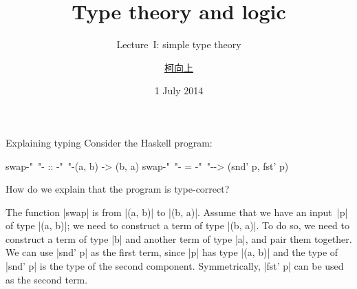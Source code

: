 \documentclass[t,compress,hyperref={hidelinks}]{beamer}
\newcommand{\lectureno}{I}
\begin{document}

\title{Type theory and logic}
\subtitle{Lecture~\lectureno: simple type theory}
\date{1 July 2014}
\author{{\href{http://www.cs.ox.ac.uk/people/hsiang-shang.ko/}{柯向上}}}

{
\begin{frame}
\titlepage
\end{frame}}

\begin{frame}[fragile]{Explaining typing}
Consider the Haskell program:
\begin{code}
swap{-"~"-}  ::  {-"~"-}(a, b) -> (b, a)
swap{-"~"-}  =   {-"~"-}\p -> (snd' p, fst' p)
\end{code}
How do we explain that the program is type-correct?

The function |swap| is from |(a, b)| to |(b, a)|.
Assume that we have an input~|p| of type |(a, b)|; we need to construct a term of type |(b, a)|.
To do so, we need to construct a term of type |b| and another term of type |a|, and pair them together.
We can use |snd' p| as the first term, since |p| has type |(a, b)| and the type of |snd' p| is the type of the second component.
Symmetrically, |fst' p| can be used as the second term.
\end{frame}
\end{document}
